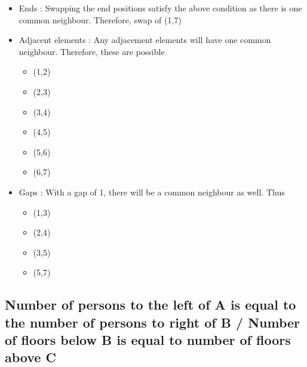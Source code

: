 \begin{itemize}
    \item Ends : Swapping the end positions satisfy the above condition as there is one common neighbour. Therefore, swap of (1,7)
    
    \item Adjacent elements : Any adjacement elements will have one common neighbour. Therefore, these are possible 
    
    \begin{multicols}{2}
        \begin{itemize}
            \item (1,2)
            \item (2,3)
            \item (3,4)
        \end{itemize}

        \columnbreak
        
        \begin{itemize}
            \item (4,5)
            \item (5,6)
            \item (6,7)
        \end{itemize}
    \end{multicols}

    \item Gaps : With a gap of 1, there will be a common neighbour as well. Thus 

    \begin{multicols}{2}
        \begin{itemize}
            \item (1,3)
            \item (2,4)
        \end{itemize}
        
        \columnbreak
        
        \begin{itemize}
            \item (3,5)
            \item (5,7)
        \end{itemize}
    \end{multicols}

\end{itemize}

\subsection{Number of persons to the left of A is equal to the number of persons to right of B / Number of floors below B is equal to number of floors above C}

